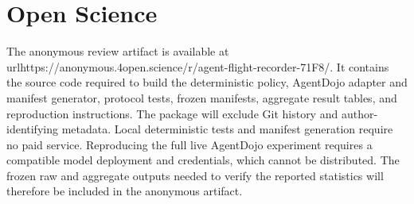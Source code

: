 \documentclass[letterpaper,twocolumn,10pt]{article}
\begin{document}
\section{Open Science}
The anonymous review artifact is available at \\url{https://anonymous.4open.science/r/agent-flight-recorder-71F8/}. It contains the source code required to build the deterministic policy, AgentDojo adapter and manifest generator, protocol tests, frozen manifests, aggregate result tables, and reproduction instructions. The package will exclude Git history and author-identifying metadata. Local deterministic tests and manifest generation require no paid service. Reproducing the full live AgentDojo experiment requires a compatible model deployment and credentials, which cannot be distributed. The frozen raw and aggregate outputs needed to verify the reported statistics will therefore be included in the anonymous artifact.



\end{document}
